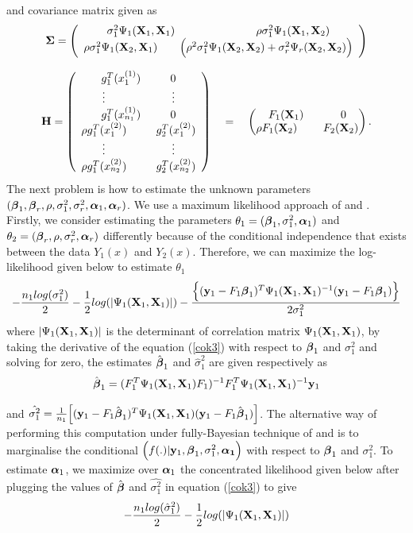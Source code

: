 and covariance matrix given as
\[ {\boldsymbol{\Sigma}}=
\left(\begin{array}{cc}
\sigma_{1}^2\Psi_1({\bf X}_1,{\bf X}_1)   ~~~~~~~~~~~~~~~~~~~~ ~~ \rho\sigma_{1}^2\Psi_1({\bf X}_1,{\bf X}_2)\\
\rho\sigma_{1}^2\Psi_1({\bf X}_2,{\bf X}_1)  ~~~~~~ \Big(\rho^2\sigma_{1}^2\Psi_1({\bf X}_2,{\bf X}_2) + \sigma_{r}^2\Psi_r({\bf X}_2,{\bf X}_2)\Big)
\end{array} \right)\]

\[ {\bf H}=
\left(
\begin{array}{cc}
g_1^T(x_1^{(1)}) ~~~~~~~~0\\
\vdots   ~~~~~~~~~~~~~~~~~~ \vdots       \\
g_1^T(x_{n_1}^{(1)}) ~~~~~~~~0  \\

\rho g_1^T(x_1^{(2)}) ~~~~~~~~g_2^T(x_1^{(2)})\\
\vdots   ~~~~~~~~~~~~~~~~~~ \vdots       \\
\rho g_1^T(x_{n_2}^{(2)}) ~~~~~~~~g_2^T(x_{n_2}^{(2)})
\end{array} 
\right)
 \quad = \quad
\begin{pmatrix}
F_1({\bf X}_1)~~~~~~~~~~0\\
\rho F_1({\bf X}_2) ~~~~~~~F_2({\bf X}_2)
\end{pmatrix}.
\]
The next problem is how to estimate the unknown parameters $({\boldsymbol{\beta}}_1,{\boldsymbol{\beta}}_r,\rho,\sigma_1^2,\sigma_r^2,{\boldsymbol{\alpha}}_1,{\boldsymbol{\alpha}}_r)$. We use a maximum likelihood approach of \citet{co3} and \citet{co4}.
Firstly, we consider estimating the parameters $\theta_1=({\boldsymbol{\beta}}_1,\sigma_1^2,{\boldsymbol{\alpha}}_1)$ and  $\theta_2=({\boldsymbol{\beta}}_r,\rho,\sigma_r^2,{\boldsymbol{\alpha}}_r)$ differently because of the conditional independence that exists between the data $Y_1(x)$ and $Y_2(x)$. Therefore, we can maximize the log-likelihood given below to estimate $\theta_1$
\begin{equation}\label{cok3}
-\frac{n_1 log(\sigma_1^2)}{2} -  \frac{1}{2}log(|\Psi_1({\bf X}_1,{\bf X}_1)|) - \frac{ \Big \{({\bf y}_1-F_1 {\boldsymbol{\beta}}_1)^T \Psi_1({\bf X}_1,{\bf X}_1)^{-1}({\bf y}_1-F_1 {\boldsymbol{\beta}}_1)\Big\}}{2\sigma_1^2}
\end{equation}
where $|\Psi_1({\bf X}_1,{\bf X}_1)|$ is the determinant of correlation matrix $\Psi_1({\bf X}_1,{\bf X}_1)$, by taking the derivative of the equation (\ref{cok3}) with
respect to ${\boldsymbol{\beta}}_1$ and $\sigma_1^2$ and solving for zero, the estimates ${\hat{\boldsymbol{\beta}}}_1$ and $\hat\sigma_1^2$ are given respectively as
$${\hat{\boldsymbol{\beta}}}_1=(F_1^T \Psi_1({\bf X}_1,{\bf X}_1) F_1)^{-1}F_1^T\Psi_1({\bf X}_1,{\bf X}_1)^{-1}{\bf y}_1$$

and $\hat{\sigma_1^2}=\frac{1}{n_1} \Big[({\bf y}_1-F_1{\hat{\boldsymbol{\beta}}}_1)^T  \Psi_1({\bf X}_1,{\bf X}_1)({\bf y}_1-F_1{\hat{\boldsymbol{\beta}}}_1)\Big]$.
The alternative way of performing this computation under fully-Bayesian technique of \citet{co1} and \citet{co2} is to marginalise the conditional $\Big(f(.) | {\bf y}_1, {\boldsymbol{\beta}}_1, \sigma_1^2, \boldsymbol{\alpha_1}\Big)$ with respect to ${\boldsymbol{\beta}}_1$ and $\sigma_1^2$. 
To estimate ${\boldsymbol{\alpha}}_1$, we maximize over ${\boldsymbol{\alpha}}_1$ the concentrated likelihood given below after plugging the values of ${\hat{\boldsymbol{\beta}}}$ and $\hat{\sigma_1^2}$ in equation (\ref{cok3}) to give
\begin{equation}
-\frac{n_1 log( \hat \sigma_1^2)}{2} -  \frac{1}{2}log(|\Psi_1({\bf X}_1,{\bf X}_1)|) 
\end{equation}


